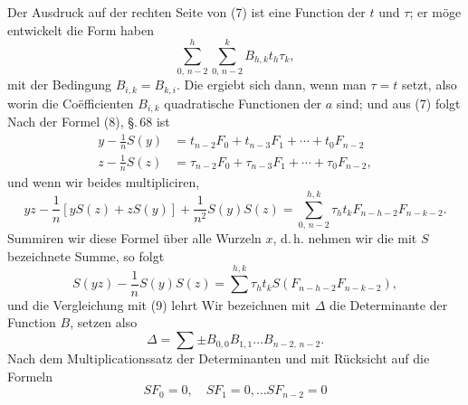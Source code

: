 Der Ausdruck auf der rechten Seite von (7) ist eine 
Function der $t$ und $\tau$; er möge entwickelt die Form
haben
\[
\sum_{0,\,n-2}^{h} \sum_{0,\,n-2}^{k} B_{h,k} t_h \tau_k,
\]
mit der Bedingung $B_{i,k} = B_{k,i}$. Die  ergiebt
sich dann, wenn man $\tau = t$ setzt, also
worin die Coëfficienten $B_{i,k}$ quadratische Functionen der $a$ sind;
und aus (7) folgt
Nach der Formel (8), \S.\,68 ist
\[
\begin{aligned}
y - \frac{1}{n} S(y) &= t_{n-2} F_0 + t_{n-3} F_1 + \cdots + t_0 F_{n-2} \\
z - \frac{1}{n} S(z) &= \tau_{n-2} F_0 + \tau_{n-3} F_1 + \cdots + \tau_0 F_{n-2},
\end{aligned}
\]
und wenn wir beides multipliciren,
\[
y z - \frac{1}{n} [y S(z) + z S(y)] + \frac{1}{n^2} S(y) S(z)
= \sum_{0,\,n-2}^{h,k} \tau_h t_k F_{n-h-2} F_{n-k-2}.
\]
Summiren wir diese Formel über alle Wurzeln $x$, d.\,h. nehmen
wir die mit $S$ bezeichnete Summe, so folgt
\[
S(y z) - \frac{1}{n} S(y) S(z) = \sum^{h,k} \tau_h t_k S(F_{n-h-2} F_{n-k-2}),
\]
und die Vergleichung mit (9) lehrt
Wir bezeichnen mit $\varDelta$ die Determinante der Function $B$,
setzen also
\[
\varDelta = \sum \pm B_{0,0} B_{1,1} \ldots B_{n-2,\,n-2}.
\]
Nach dem Multiplicationssatz der Determinanten und mit
Rücksicht auf die Formeln
\[
S F_0 = 0, \quad S F_1 = 0, \ldots S F_{n-2} = 0
\]
